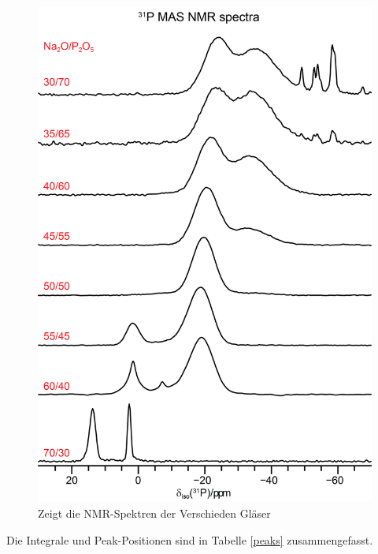 \documentclass[12pt, a4paper]{article}
\begin{document}
\begin{figure}[!h]
  \centering
  \includegraphics[scale=0.3]{NMR-spectra-2024-g1.png}
  \caption{Zeigt die NMR-Spektren der Verschieden Gläser}
  \label{nmrspektrums}
\end{figure}

\noindent
Die Integrale und Peak-Positionen sind in Tabelle \ref{peaks} zusammengefasst.
\newpage
\end{document}
